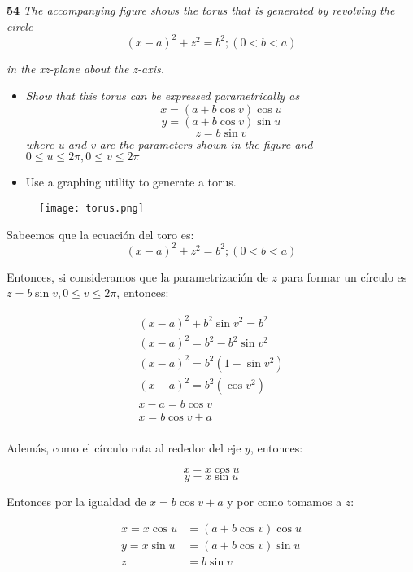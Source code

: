 \documentclass[11pt]{report}
\begin{document}
{}

\textbf{54} \textit{The accompanying figure shows the torus that is generated
by revolving the circle}
\[
    (x - a)^2 + z^2 = b^2; (0 < b < a)
\]

\textit{in the xz-plane about the z-axis.}

\begin{itemize}
    \item \textit{Show that this torus can be expressed parametrically as}
    \[
        x = (a + b \cos v) \cos u
    \]
    \[
        y = (a + b \cos v) \sin u
    \]
    \[
        z = b \sin v
    \]
    \textit{where u and v are the parameters shown in the figure
        and} \( 0 \leq u \leq 2 \pi, 0 \leq v \leq 2\pi \)
    \item Use a graphing utility to generate a torus.
\end{itemize}

\begin{figure}[h]
    \centering
    \texttt{[image: torus.png]}
\end{figure}

Sabeemos que la ecuación del toro es:
\[
    (x - a)^2 + z^2 = b^2; (0 < b < a)
\]

Entonces, si consideramos que la parametrización de $z$ para formar un círculo
es \(z = b \sin{v}, 0 \leq v \leq 2 \pi \), entonces:

\begin{equation*}
\begin{split}
    (x - a)^2 + b^2 \sin{v}^2 = b^2 \\
    (x - a)^2 = b^2  - b^2 \sin{v}^2 \\
    (x - a)^2 = b^2 \left( 1 - \sin{v}^2 \right) \\
    (x - a)^2 = b^2 \left( \cos{v}^2 \right) \\
    x - a = b \cos{v} \\
    x = b \cos{v} + a\\
\end{split}
\end{equation*}

Además, como el círculo rota al rededor del eje $y$, entonces:

\[
    x = x \cos{u}
\]
\[
    y = x \sin{u}
\]

Entonces por la igualdad de \(x = b \cos{v} + a\) y por como tomamos a \(z\):

\begin{equation*}
\begin{split}
    x = x \cos{u} &= (a + b \cos{v}) \cos{u} \\
    y = x \sin{u} &= (a + b \cos{v}) \sin{u} \\
    z &= b \sin{v}
\end{split}
\end{equation*}
\end{document}
